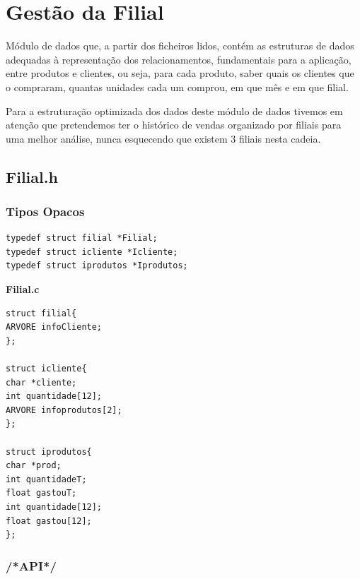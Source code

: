 \section{Gestão da Filial}

Módulo de dados que, a partir dos ficheiros lidos, contém as estruturas de dados adequadas à representação dos relacionamentos, fundamentais para a aplicação, entre produtos e clientes, ou seja, para cada produto, saber quais os clientes que o compraram, quantas unidades cada um comprou, em que mês e em que filial.

 Para a estruturação optimizada dos dados deste módulo de dados tivemos em atenção que pretendemos ter o histórico de vendas organizado por filiais para uma melhor análise, nunca esquecendo que existem 3 filiais nesta cadeia. 

\subsection{Filial.h}

\subsubsection{Tipos Opacos}
\begin{Verbatim}
typedef struct filial *Filial;
typedef struct icliente *Icliente;
typedef struct iprodutos *Iprodutos;
\end{Verbatim}

\textbf{Filial.c}
\begin{verbatim}
struct filial{
ARVORE infoCliente;
};

struct icliente{
char *cliente;
int quantidade[12];
ARVORE infoprodutos[2];
};

struct iprodutos{
char *prod;
int quantidadeT;
float gastouT;
int quantidade[12];
float gastou[12];
};
\end{verbatim}




\subsubsection{/*API*/}

